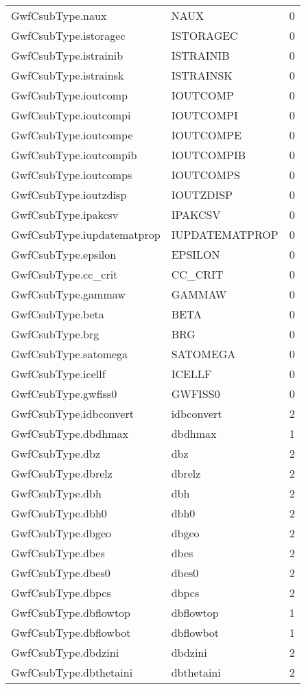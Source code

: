 \begin{longtable}{p{6cm} p{4cm} p{2cm} }
GwfCsubType.naux &  NAUX & 0 \\ 
GwfCsubType.istoragec &  ISTORAGEC & 0 \\ 
GwfCsubType.istrainib &  ISTRAINIB & 0 \\ 
GwfCsubType.istrainsk &  ISTRAINSK & 0 \\ 
GwfCsubType.ioutcomp &  IOUTCOMP & 0 \\ 
GwfCsubType.ioutcompi &  IOUTCOMPI & 0 \\ 
GwfCsubType.ioutcompe &  IOUTCOMPE & 0 \\ 
GwfCsubType.ioutcompib &  IOUTCOMPIB & 0 \\ 
GwfCsubType.ioutcomps &  IOUTCOMPS & 0 \\ 
GwfCsubType.ioutzdisp &  IOUTZDISP & 0 \\ 
GwfCsubType.ipakcsv &  IPAKCSV & 0 \\ 
GwfCsubType.iupdatematprop &  IUPDATEMATPROP & 0 \\ 
GwfCsubType.epsilon &  EPSILON & 0 \\ 
GwfCsubType.cc\_crit &  CC\_CRIT & 0 \\ 
GwfCsubType.gammaw &  GAMMAW & 0 \\ 
GwfCsubType.beta &  BETA & 0 \\ 
GwfCsubType.brg &  BRG & 0 \\ 
GwfCsubType.satomega &  SATOMEGA & 0 \\ 
GwfCsubType.icellf &  ICELLF & 0 \\ 
GwfCsubType.gwfiss0 &  GWFISS0 & 0 \\ 
GwfCsubType.idbconvert & idbconvert & 2 \\ 
GwfCsubType.dbdhmax & dbdhmax & 1 \\ 
GwfCsubType.dbz & dbz & 2 \\ 
GwfCsubType.dbrelz & dbrelz & 2 \\ 
GwfCsubType.dbh & dbh & 2 \\ 
GwfCsubType.dbh0 & dbh0 & 2 \\ 
GwfCsubType.dbgeo & dbgeo & 2 \\ 
GwfCsubType.dbes & dbes & 2 \\ 
GwfCsubType.dbes0 & dbes0 & 2 \\ 
GwfCsubType.dbpcs & dbpcs & 2 \\ 
GwfCsubType.dbflowtop & dbflowtop & 1 \\ 
GwfCsubType.dbflowbot & dbflowbot & 1 \\ 
GwfCsubType.dbdzini & dbdzini & 2 \\ 
GwfCsubType.dbthetaini & dbthetaini & 2 \\ 

\end{longtable}
